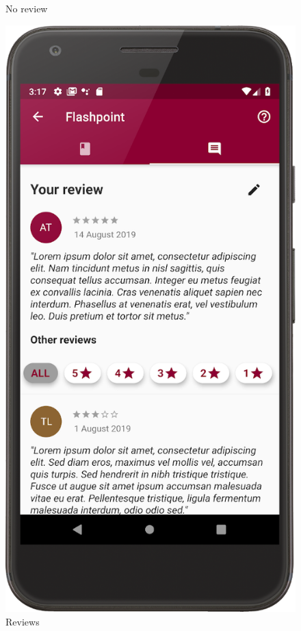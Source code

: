 \begin{figure}[!htb]
\begin{minipage}[b]{0.3\textwidth}
        \caption{No review}
        \label{ref:noreview}
    \end{minipage}
    \hfill
    \begin{minipage}[b]{0.3\textwidth}
        \centering
        \includegraphics[scale=1]{images/reviews-page.png}
        \caption{Reviews}
        \label{ref:reviewspage}
    \end{minipage}
\end{figure}
